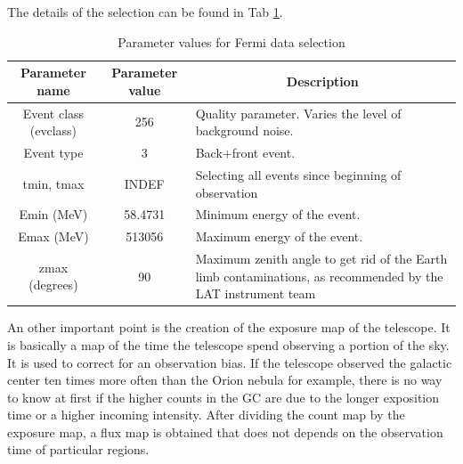 The details of the selection can be found in Tab \ref{tab:fermi_selection_parameters}.

\begin{table}[h]
\centering
\begin{tabular}{|c|c|p{8cm}|}
\hline
\multicolumn{1}{|c|}{\textbf{Parameter name}} & \textbf{Parameter value} & \multicolumn{1}{c|}{\textbf{Description}}                                                                   \\ \hline
Event class (evclass)                         & 256                      & Quality parameter. Varies the level of background noise.                                                    \\ \hline
Event type                                    & 3                        & Back+front event.                                                                                           \\ \hline
tmin, tmax                                    & INDEF                    & Selecting all events since beginning of observation                                                         \\ \hline
Emin (MeV)                                    & 58.4731                  & Minimum energy of the event.                                                                                \\ \hline
Emax (MeV)                                    & 513056                   & Maximum energy of the event.                                                                                \\ \hline
zmax (degrees)                                & 90                       & Maximum zenith angle to get rid of the Earth limb contaminations, as recommended by the LAT instrument team \\ \hline
\end{tabular}
\caption{Parameter values for Fermi data selection}
\label{tab:fermi_selection_parameters}
\end{table}

An other important point is the creation of the exposure map of the telescope. It is basically a map of the time the telescope spend observing a portion of the sky. It is used to correct for an observation bias. If the telescope observed the galactic center ten times more often than the Orion nebula for example, there is no way to know at first if the higher counts in the GC are due to the longer exposition time or a higher incoming intensity. After dividing the count map by the exposure map, a flux map is obtained that does not depends on the observation time of particular regions.


